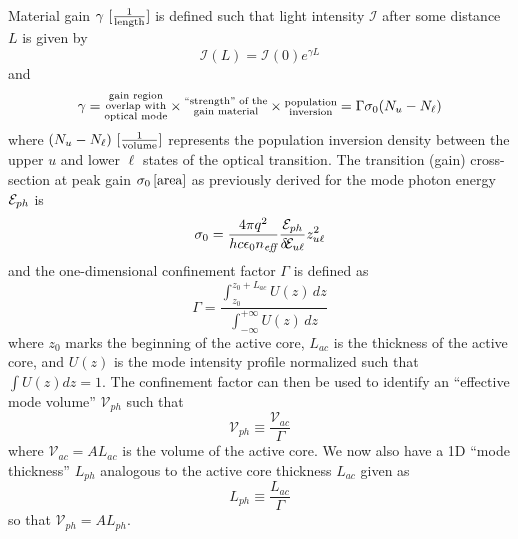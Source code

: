 \documentclass[12pt]{report}
\begin{document}
Material gain $\gamma~[\frac{1}{\textnormal{length}}]$ is defined such that light intensity $\mathcal{I}$ after some distance $L$ is given by
\begin{equation}
\mathcal{I}(L) = \mathcal{I}(0) e^{\gamma L}
\end{equation}
and
\begin{equation}
\gamma = \begin{subarray}{c}\textnormal{gain region}\\\textnormal{overlap with}\\\textnormal{optical mode}\end{subarray} \times \begin{subarray}{c}\textnormal{``strength'' of the}\\\textnormal{gain material}\end{subarray}
\times \begin{subarray}{c}\textnormal{population}\\\textnormal{inversion}\end{subarray} = \Gamma \sigma_0 (N_u-N_\ell)
\end{equation}
where $(N_u-N_\ell)~[\frac{1}{\textnormal{volume}}]$ represents the population inversion density between the upper $u$ and lower $\ell$ states of the optical transition. The transition (gain) cross-section at peak gain $\sigma_0 \left[\textnormal{area}\right]$ as previously derived for the mode photon energy $\EE_{ph}$ is
\begin{equation}
\sigma_0 = \frac{4 \pi q^2}{h c \epsilon_0 n_\textit{eff}} \frac{\EE_{ph}}{\delta\!\EE_{u\ell}} z_{u\ell}^2
\end{equation}
and the one-dimensional confinement factor $\Gamma$ is defined as \cite{ColdrenCorzine}
\begin{equation}
\label{chpt1eqn:Gamma}
\Gamma = \frac{\int_{z_0}^{z_0+L_{ac}} \! U(z) \, dz}{\int_{-\infty}^{+\infty} \! U(z) \, dz}
\end{equation}
where $z_0$ marks the beginning of the active core, $L_{ac}$ is the thickness of the active core, %
and $U(z)$ is the mode intensity profile normalized such that $\int U(z) dz=1$.  The confinement factor can then be used to identify an ``effective mode volume'' $\mathcal{V}_{ph}$ such that
\begin{equation}
\mathcal{V}_{ph}\equiv\frac{\mathcal{V}_{ac}}{\Gamma}
\end{equation}
where $\mathcal{V}_{ac}=A L_{ac}$ is the volume of the active core.  We now also have a 1D ``mode thickness'' $L_{ph}$ analogous to the active core thickness $L_{ac}$ given as
\begin{equation}
L_{ph}\equiv\frac{L_{ac}}{\Gamma}
\end{equation}
so that $\mathcal{V}_{ph}=A L_{ph}$.
\end{document}
